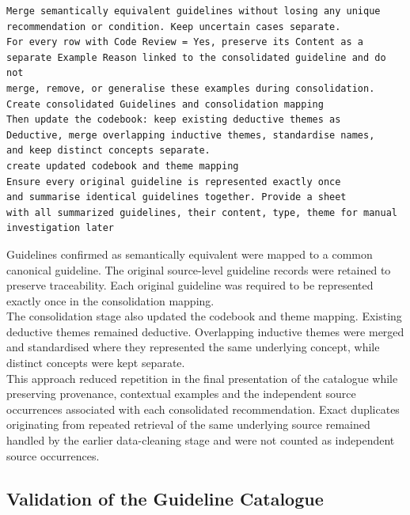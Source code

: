\begin{listing}[H]
\begin{verbatim}
Merge semantically equivalent guidelines without losing any unique
recommendation or condition. Keep uncertain cases separate.
For every row with Code Review = Yes, preserve its Content as a
separate Example Reason linked to the consolidated guideline and do not
merge, remove, or generalise these examples during consolidation.
Create consolidated Guidelines and consolidation mapping
Then update the codebook: keep existing deductive themes as
Deductive, merge overlapping inductive themes, standardise names,
and keep distinct concepts separate.
create updated codebook and theme mapping
Ensure every original guideline is represented exactly once
and summarise identical guidelines together. Provide a sheet
with all summarized guidelines, their content, type, theme for manual
investigation later
\end{verbatim}
\caption{Prompt for guideline consolidation and codebook refinement}
\label{lst:prompt_guideline_consolidation}
\end{listing}

Guidelines confirmed as semantically equivalent were mapped to a common canonical
guideline. The original source-level guideline records were retained to
preserve traceability. Each original guideline was required to be represented exactly
once in the consolidation mapping.
\\
The consolidation stage also updated the codebook and theme mapping. Existing deductive
themes remained deductive. Overlapping inductive themes were merged and standardised
where they represented the same underlying concept, while distinct concepts were kept
separate.
\\
This approach reduced repetition in the final presentation of the catalogue while
preserving provenance, contextual examples and the independent source occurrences
associated with each consolidated recommendation. Exact duplicates originating from
repeated retrieval of the same underlying source remained handled by the earlier
data-cleaning stage and were not counted as independent source occurrences.

\subsection{Validation of the Guideline Catalogue}
\label{sec:meth_validation}

